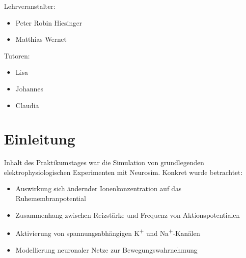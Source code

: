 \documentclass[a4paper]{article}
\begin{document}
\begin{titlepage}
{\LARGE Lehrveranstalter:}
\begin{itemize}
\item  Peter Robin Hiesinger
\item Matthias Wernet
\end{itemize}
\vspace{2.5\baselineskip}

{\LARGE Tutoren:}
\begin{itemize}
\item Lisa
\item Johannes
\item Claudia
\end{itemize}
	
\end{titlepage}
\section{Einleitung}
Inhalt des Praktikumstages war die Simulation von grundlegenden elektrophysiologischen Experimenten mit Neurosim\cite{Neurosim}. Konkret wurde betrachtet: \vspace{1.0\baselineskip}
\begin{itemize}
    \item Auswirkung sich ändernder Ionenkonzentration auf das Ruhemembranpotential
    \item Zusammenhang zwischen Reizstärke und Frequenz von Aktionspotentialen
    \item Aktivierung von spannungsabhängigen K\textsuperscript{+} und Na\textsuperscript{+}-Kanälen
    \item Modellierung neuronaler Netze zur Bewegungswahrnehmung
\end{itemize}
\vspace{1.0\baselineskip}
\end{document}
